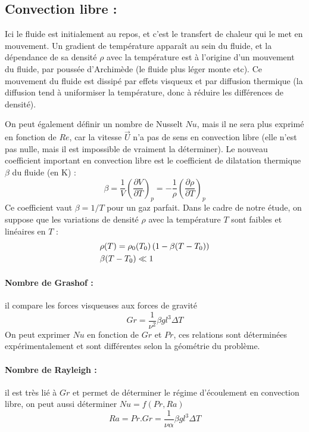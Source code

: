 \subsection{Convection libre :}
Ici le fluide est initialement au repos, et c'est le transfert de chaleur qui le met en mouvement. Un gradient de température apparaît au sein du fluide, et la dépendance de sa densité $\rho$ avec la température est à l'origine d'un mouvement du fluide, par poussée d'Archimède (le fluide plus léger monte etc). Ce mouvement du fluide est dissipé par effets visqueux et par diffusion thermique (la diffusion tend à uniformiser la température, donc à réduire les différences de densité).

On peut également définir un nombre de Nusselt $Nu$, mais il ne sera plus exprimé en fonction de $Re$, car la vitesse $\vec{U}$ n'a pas de sens en convection libre (elle n'est pas nulle, mais il est impossible de vraiment la déterminer). Le nouveau coefficient important en convection libre est le coefficient de dilatation thermique $\beta$ du fluide (en K) :
%
\begin{equation}
    \beta = \frac{1}{V} \left( \frac{\partial V}{\partial T} \right)_p
          = - \frac{1}{\rho} \left( \frac{\partial \rho}{\partial T} \right)_p
\end{equation}
%
Ce coefficient vaut $\beta = 1/T$ pour un gaz parfait. Dans le cadre de notre étude, on suppose que les variations de densité $\rho$ avec la température $T$ sont faibles et linéaires en $T$ :
%
\begin{align}
    &\rho(T) = \rho_0(T_0) \left( 1 - \beta(T-T_0) \right) \\
    \notag &\beta (T-T_0) \ll 1
\end{align}

\paragraph{Nombre de Grashof :}il compare les forces visqueuses aux forces de gravité
%
\begin{equation}
    Gr = \frac{1}{\nu^2}\beta g l^3 \Delta T
\end{equation}
%
On peut exprimer $Nu$ en fonction de $Gr$ et $Pr$, ces relations sont déterminées expérimentalement et sont différentes selon la géométrie du problème.

\paragraph{Nombre de Rayleigh :}il est très lié à $Gr$ et permet de déterminer le régime d'écoulement en convection libre, on peut aussi déterminer $Nu = f(Pr,Ra)$
%
\begin{equation}
    Ra = Pr.Gr
       = \frac{1}{\nu\alpha}\beta g l^3 \Delta T
\end{equation}

